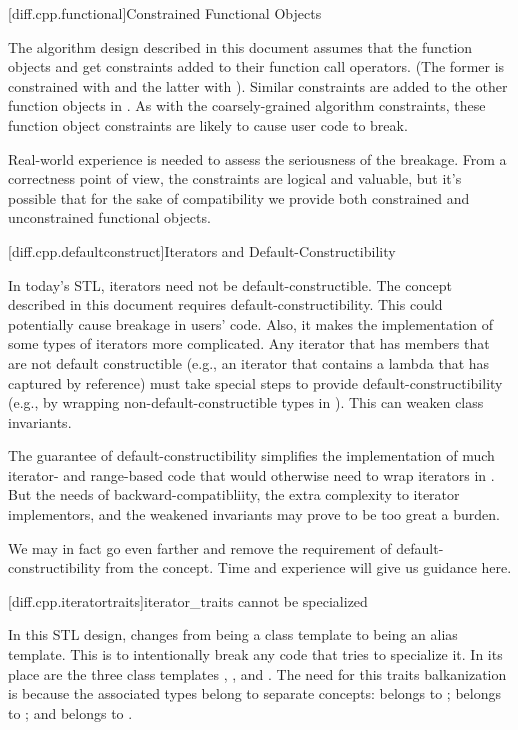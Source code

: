 [diff.cpp.functional]{Constrained Functional Objects}

\pnum
The algorithm design described in this document assumes that the function objects
 and  get constraints added to their function call operators.
(The former is constrained with  and the latter with
). Similar constraints are added to the other function objects
in . As with the
coarsely-grained algorithm constraints, these function object constraints are likely to cause
user code to break.

\pnum
Real-world experience is needed to assess the seriousness of the breakage. From a correctness point
of view, the constraints are logical and valuable, but it's possible that for the sake of
compatibility we provide both constrained and unconstrained functional objects.

[diff.cpp.defaultconstruct]{Iterators and Default-Constructibility}

\pnum
In today's STL, iterators need not be default-constructible. The  concept described
in this document requires default-constructibility. This could potentially cause breakage in users'
code. Also, it makes the implementation of some types of iterators more complicated. Any iterator
that has members that are not default constructible (e.g., an iterator that contains a lambda that
has captured by reference) must take special steps to provide default-constructibility (e.g.,
by wrapping non-default-constructible types in ). This can weaken class
invariants.

\pnum
The guarantee of default-constructibility simplifies the implementation of much iterator- and
range-based code that would otherwise need to wrap iterators in . But the
needs of backward-compatibliity, the extra complexity to iterator implementors, and the weakened
invariants may prove to be too great a burden.

\pnum
We may in fact go even farther and remove the requirement of default-constructibility from the
 concept. Time and experience will give us guidance here.

[diff.cpp.iteratortraits]{iterator_traits cannot be specialized}

\pnum
In this STL design,  changes from being a class template to being an
alias template. This is to intentionally break any code that tries to specialize it. In its place
are the three class templates , , and
. The need for this traits balkanization is because the associated types
belong to separate concepts:  belongs to ;
 belongs to ; and  belongs to
.

